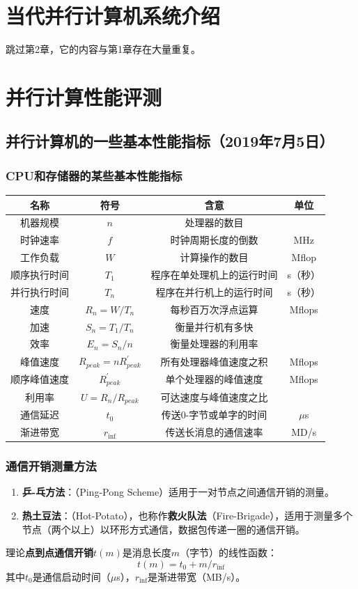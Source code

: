\documentclass{article}
\begin{document}
	\section{当代并行计算机系统介绍}
	跳过第2章，它的内容与第1章存在大量重复。
	\section{并行计算性能评测}		
		\subsection{并行计算机的一些基本性能指标（2019年7月5日）}
			\subsubsection{CPU和存储器的某些基本性能指标}
				\begin{table}[H]
					\centering
					\begin{tabular}{|c|c|c|c|}
						\hline
						名称&符号&含意&单位\\
						\hline
						机器规模&$n$&处理器的数目&\\
						时钟速率&$f$&时钟周期长度的倒数&MHz\\
						工作负载&$W$&计算操作的数目&Mflop\\
						顺序执行时间&$T_{1}$&程序在单处理机上的运行时间&s（秒）\\
						并行执行时间&$T_{n}$&程序在并行机上的运行时间&s（秒）\\
						速度&$R_{n}=W/T_{n}$&每秒百万次浮点运算&Mflops\\
						加速&$S_{n}=T_{1}/T_{n}$&衡量并行机有多快&\\
						效率&$E_{n}=S_{n}/n$&衡量处理器的利用率&\\
						峰值速度&$R_{peak}=nR_{peak}^{'}$&所有处理器峰值速度之积&Mflops\\
						顺序峰值速度&$R_{peak}^{'}$&单个处理器的峰值速度&Mflops\\
						利用率&$U=R_{n}/R_{peak}$&可达速度与峰值速度之比&\\
						通信延迟&$t_{0}$&传送0-字节或单字的时间&$\mu$s\\
						渐进带宽&$r_{\inf}$&传送长消息的通信速率&MD/s\\
						\hline
					\end{tabular}
				\end{table}
			\subsubsection{通信开销测量方法}
				\begin{enumerate}
					\item \textbf{乒-乓方法}：（Ping-Pong Scheme）适用于一对节点之间通信开销的测量。
					\item \textbf{热土豆法}：（Hot-Potato），也称作\textbf{救火队法}（Fire-Brigade），适用于测量多个节点（两个以上）以环形方式通信，数据包传递一圈的通信开销。
				\end{enumerate}
				理论\textbf{点到点通信开销}$t(m)$是消息长度$m$（字节）的线性函数：
				$$t(m)=t_{0}+m/r_{\inf}$$
				其中$t_{0}$是通信启动时间（$\mu$s），$r_{\inf}$是渐进带宽（MB/s）。
\end{document}

